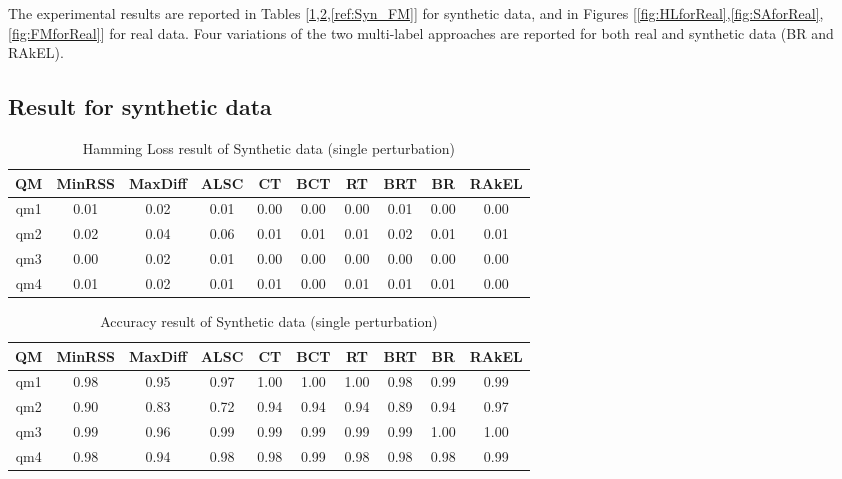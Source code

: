 \documentclass[11pt]{article}
\begin{document}
The experimental results are reported in Tables [\ref{ref:Syn_HL},\ref{ref:Syn_SA},\ref{ref:Syn_FM}] for synthetic data, and in  Figures [\ref{fig:HLforReal},\ref{fig:SAforReal},\ref{fig:FMforReal}] for real data. Four variations of the two multi-label approaches are reported for both real and synthetic data (BR and RAkEL).
\subsection{Result for synthetic data}



\begin {table}[h]
\scriptsize
\centering
\begin{tabular}{c|c|c|c|c|c|c|c|c|c}	
	\hline\hline	
	
	

	
QM  &  MinRSS  &  MaxDiff  &  ALSC  &  CT  &  BCT  &  RT  &  BRT  &  BR  &  RAkEL \\ \hline
qm1  & 0.01 & 0.02 & 0.01 & 0.00 & 0.00 & 0.00 & 0.01 & 0.00 & 0.00 \\
qm2  & 0.02 & 0.04 & 0.06 & 0.01 & 0.01 & 0.01 & 0.02 & 0.01 & 0.01 \\
qm3  & 0.00 & 0.02 & 0.01 & 0.00 & 0.00 & 0.00 & 0.00 & 0.00 & 0.00 \\
qm4  & 0.01 & 0.02 & 0.01 & 0.01 & 0.00 & 0.01 & 0.01 & 0.01 & 0.00 \\
 \hline\hline
\end{tabular}
\caption {Hamming Loss result of Synthetic data (single perturbation)} \label{ref:Syn_HL} 
\end{table}




\begin {table}[h]
\scriptsize
\centering
\begin{tabular}{c|c|c|c|c|c|c|c|c|c}	
	\hline\hline	
QM & MinRSS & MaxDiff & ALSC & CT & BCT & RT & BRT & BR & RAkEL \\ \hline
qm1 & 0.98 & 0.95 & 0.97 & 1.00 & 1.00 & 1.00 & 0.98 & 0.99 & 0.99 \\
qm2 &0.90 & 0.83 &0.72 & 0.94 & 0.94 & 0.94 & 0.89 & 0.94 & 0.97 \\
qm3 & 0.99 & 0.96 & 0.99 & 0.99 & 0.99 & 0.99 & 0.99 & 1.00 & 1.00  \\
qm4 & 0.98 & 0.94 & 0.98 & 0.98 & 0.99 & 0.98 & 0.98 & 0.98 & 0.99	\\ 
\hline\hline
\end{tabular}
\caption {Accuracy result of Synthetic data (single perturbation)} \label{ref:Syn_SA} 
\end{table}
\end{document}
